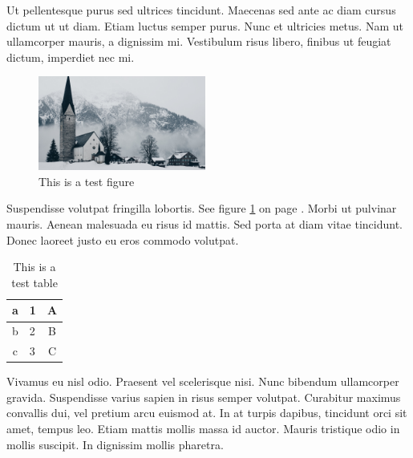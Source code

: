 \documentclass[11pt]{article}
\begin{document}
Ut pellentesque purus sed ultrices tincidunt. Maecenas sed ante ac diam cursus dictum ut ut diam. Etiam luctus semper purus. Nunc et ultricies metus. Nam ut ullamcorper mauris, a dignissim mi. Vestibulum risus libero, finibus ut feugiat dictum, imperdiet nec mi. 

\begin{figure}[h]
    \centering
    \includegraphics[width=5.5cm]{test_figure.jpg}
    \caption{This is a test figure}
    \label{fig:my_test_figure} %
\end{figure}

Suspendisse volutpat fringilla lobortis. See figure \ref{fig:my_test_figure} on page \pageref{fig:my_test_figure}. Morbi ut pulvinar mauris. Aenean malesuada eu risus id mattis. Sed porta at diam vitae tincidunt. Donec laoreet justo eu eros commodo volutpat. 

\begin{table}[h]
    \centering
    \begin{tabular}{c|lc} %
         a & 1 & A \\ %
         \hline %
         b & 2 & B \\
         c & 3 & C 
    \end{tabular}
    \caption{This is a test table}
    \label{tab:my_test_table}
\end{table}

Vivamus eu nisl odio. Praesent vel scelerisque nisi. Nunc bibendum ullamcorper gravida. Suspendisse varius sapien in risus semper volutpat. Curabitur maximus convallis dui, vel pretium arcu euismod at. In at turpis dapibus, tincidunt orci sit amet, tempus leo. Etiam mattis mollis massa id auctor. Mauris tristique odio in mollis suscipit. In dignissim mollis pharetra. 
\end{document}
